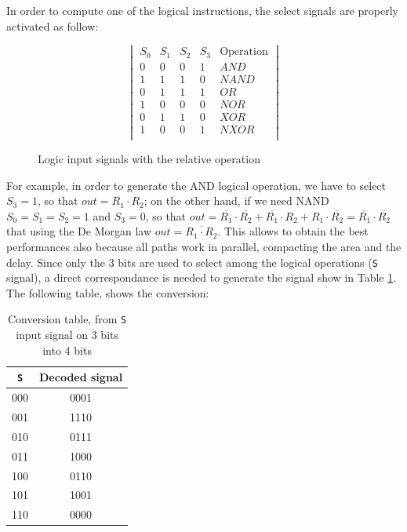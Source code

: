     In order to compute one of the logical instructions, the select signals are properly activated as follow:
    
    \begin{figure}[ht]
        \centering
    \[
    \begin{vmatrix}
        S_0 & S_1 & S_2 & S_3 & \text{Operation}\\
        0 & 0 & 0 & 1 & AND \\
        1 & 1 & 1 & 0 & NAND \\
        0 & 1 & 1 & 1 & OR \\
        1 & 0 & 0 & 0 & NOR \\
        0 & 1 & 1 & 0 & XOR \\
        1 & 0 & 0 & 1 & NXOR \\
    \end{vmatrix}
    \]
      \caption{Logic input signals with the relative operation}
      \label{tab:log_sign}
\end{figure}
    
    For example, in order to generate the AND logical operation, we have to select $S_3 = 1$, so that $out = R_1 \cdot R_2$; on the other hand, if we need NAND $S_0 = S_1 = S_2 = 1$ and $S_3 = 0$, so that $out = \overline{R_1} \cdot \overline{R_2} + \overline{R_1} \cdot R_2 + R_1 \cdot \overline{R_2} = \overline{R_1} \cdot \overline{R_2}$ that using the De Morgan law $out = \overline{R_1 \cdot R_2}$.
    This allows to obtain the best performances also because all paths work in parallel, compacting the area and the delay.\newline\newline
    Since only the 3 bits are used to select among the logical operations (\texttt{S} signal), a direct correspondance is needed to generate the signal show in Table \ref{tab:log_sign}. The following table, shows the conversion:
    \begin{table}[H]
        \begin{center}
            \begin{tabular}{ c| c}
                \texttt{S} & Decoded signal \\
                \hline
                000 & 0001 \\
                001 & 1110 \\
                010 & 0111 \\
                011 & 1000 \\
                100 & 0110 \\ 
                101 & 1001 \\ 
                110 & 0000 \\ 
                
            \end{tabular}
            \caption{Conversion table, from \texttt{S} input signal on 3 bits into 4 bits}
        \end{center}
    \end{table}

